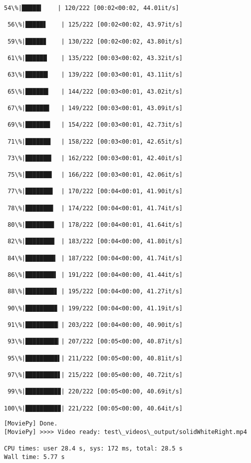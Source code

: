 \documentclass[11pt]{article}
\begin{document}
\begin{Verbatim}[commandchars=\\\{\}]
 54\%|█████▍    | 120/222 [00:02<00:02, 44.01it/s]

 56\%|█████▋    | 125/222 [00:02<00:02, 43.97it/s]

 59\%|█████▊    | 130/222 [00:02<00:02, 43.80it/s]

 61\%|██████    | 135/222 [00:03<00:02, 43.32it/s]

 63\%|██████▎   | 139/222 [00:03<00:01, 43.11it/s]

 65\%|██████▍   | 144/222 [00:03<00:01, 43.02it/s]

 67\%|██████▋   | 149/222 [00:03<00:01, 43.09it/s]

 69\%|██████▉   | 154/222 [00:03<00:01, 42.73it/s]

 71\%|███████   | 158/222 [00:03<00:01, 42.65it/s]

 73\%|███████▎  | 162/222 [00:03<00:01, 42.40it/s]

 75\%|███████▍  | 166/222 [00:03<00:01, 42.06it/s]

 77\%|███████▋  | 170/222 [00:04<00:01, 41.90it/s]

 78\%|███████▊  | 174/222 [00:04<00:01, 41.74it/s]

 80\%|████████  | 178/222 [00:04<00:01, 41.64it/s]

 82\%|████████▏ | 183/222 [00:04<00:00, 41.80it/s]

 84\%|████████▍ | 187/222 [00:04<00:00, 41.74it/s]

 86\%|████████▌ | 191/222 [00:04<00:00, 41.44it/s]

 88\%|████████▊ | 195/222 [00:04<00:00, 41.27it/s]

 90\%|████████▉ | 199/222 [00:04<00:00, 41.19it/s]

 91\%|█████████▏| 203/222 [00:04<00:00, 40.90it/s]

 93\%|█████████▎| 207/222 [00:05<00:00, 40.87it/s]

 95\%|█████████▌| 211/222 [00:05<00:00, 40.81it/s]

 97\%|█████████▋| 215/222 [00:05<00:00, 40.72it/s]

 99\%|█████████▉| 220/222 [00:05<00:00, 40.69it/s]

100\%|█████████▉| 221/222 [00:05<00:00, 40.64it/s]
    \end{Verbatim}

    \begin{Verbatim}[commandchars=\\\{\}]
[MoviePy] Done.
[MoviePy] >>>> Video ready: test\_videos\_output/solidWhiteRight.mp4 

CPU times: user 28.4 s, sys: 172 ms, total: 28.5 s
Wall time: 5.77 s

    \end{Verbatim}
\end{document}
